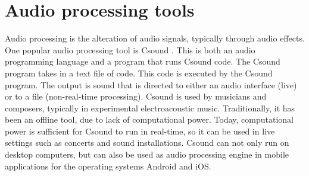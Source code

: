 \section{Audio processing tools}
Audio processing is the alteration of audio signals, typically through audio effects. One popular audio processing tool is Csound \citep{csound}. This is both an audio programming language and a program that runs Csound code. The Csound program takes in a text file of code. This code is executed by the Csound program. The output is sound that is directed to either an audio interface (live) or to a file (non-real-time processing). Csound is used by musicians and composers, typically in experimental electroacoustic music. Traditionally, it has been an offline tool, due to lack of computational power. Today, computational power is sufficient for Csound to run in real-time, so it can be used in live settings such as concerts and sound installations. Csound can not only run on desktop computers, but can also be used as audio processing engine in mobile applications for the operating systems Android and iOS.
